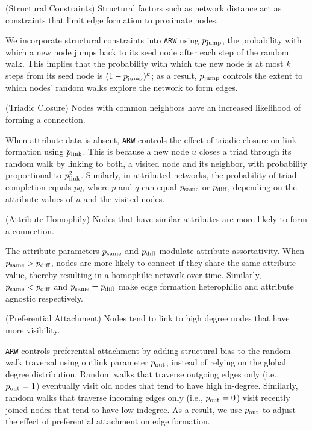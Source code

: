 \begin{ph}
	(Structural Constraints) Structural factors such as network distance
	act as constraints that limit edge formation to proximate nodes.  \cite{35626}
\end{ph}

We incorporate structural constraints into \texttt{ARW} using $p_{\scriptsize\mbox{jump}}$, the probability with
which a new node jumps back to its seed node after each step of the random walk. This implies
that the probability with which the new node is at most $k$ steps from its seed node is $(1-p_{\scriptsize\mbox{jump}})^k$;
as a result, $p_{\scriptsize\mbox{jump}}$ controls the extent to which nodes' random walks explore the network to form edges.

\begin{ph}
	(Triadic Closure) Nodes with common neighbors have an
	increased likelihood of forming a connection. \cite{simmel1950sociology}
\end{ph}

When attribute data is absent, \texttt{ARW} controls
the effect of triadic closure on link formation using $p_{\scriptsize\mbox{link}}$. This is because
a new node $u$ closes a triad through its random walk by linking to both, a visited node
and its neighbor, with probability proportional to $p_{\scriptsize\mbox{link}}^2$.
Similarly, in attributed networks, the probability of triad completion equals $pq$,
where $p$ and $q$ can equal $p_{\scriptsize\mbox{same}}$ or $p_{\scriptsize\mbox{diff}}$, depending on the attribute values of
$u$ and the visited nodes.

\begin{ph}
	(Attribute Homophily) Nodes that have similar attributes are more likely
	to form a connection. \cite{mcpherson2001birds}
\end{ph}
The attribute parameters $p_{\scriptsize\mbox{same}}$ and $p_{\scriptsize\mbox{diff}}$ modulate
attribute assortativity. When $p_{\scriptsize\mbox{same}} > p_{\scriptsize\mbox{diff}}$, nodes are more likely to connect if they share
the same attribute value, thereby resulting in a homophilic network over time. Similarly,
$p_{\scriptsize\mbox{same}} < p_{\scriptsize\mbox{diff}}$ and $p_{\scriptsize\mbox{same}}=p_{\scriptsize\mbox{diff}}$ make edge formation heterophilic and attribute agnostic respectively.

\begin{ph}
	(Preferential Attachment) Nodes tend to link to high degree nodes that have more
	visibility. \cite{barabasi1999emergence}
\end{ph}
\texttt{ARW} controls preferential attachment by adding structural bias to the
random walk traversal using outlink parameter $p_{\scriptsize\mbox{out}}$, instead of relying on the
global degree distribution. Random walks that traverse outgoing edges only
(i.e., $p_{\scriptsize\mbox{out}} =1$) eventually visit old nodes that tend to have high in-degree.
Similarly, random walks that traverse incoming edges only (i.e., $p_{\scriptsize\mbox{out}}=0$) visit
recently joined nodes that tend to have low indegree. As a result, we use
$p_{\scriptsize\mbox{out}}$ to adjust the effect of preferential attachment on edge formation.

